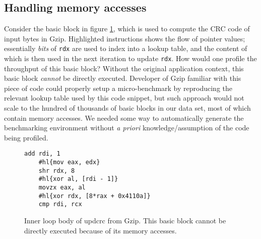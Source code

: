 \subsection{Handling memory accesses}
Consider the basic block in figure \ref{fig:mem-ex},
which is used to compute the CRC code of input bytes in Gzip.
Highlighted instructions shows the flow of pointer values;
essentially \textit{bits} of \verb|rdx| are used to index into a lookup table, 
and the content of which is then used in the next iteration to 
update \verb|rdx|.
How would one profile the throughput of this basic block?
Without the original application context,
this basic block \textit{cannot} be directly executed.
Developer of Gzip familiar with this piece of code could 
properly setup a micro-benchmark by reproducing the
relevant lookup table used by this code snippet,
but such approach would not scale to the hundred of 
thousands of basic blocks in our data set, most of which contain memory accesses.
We needed some way to automatically generate the benchmarking environment
without \textit{a priori} knowledge/assumption of the code being profiled.

\begin{figure}[h]
\begin{Verbatim}[commandchars=\#\{\}]
    add rdi, 1
    #hl{mov eax, edx}
    shr rdx, 8
    #hl{xor al, [rdi - 1]}
    movzx eax, al
    #hl{xor rdx, [8*rax + 0x4110a]}
    cmp rdi, rcx
\end{Verbatim}
\caption{Inner loop body of updcrc from Gzip.
This basic block cannot be directly executed because
of its memory accesses.}
\label{fig:mem-ex}
\end{figure}

